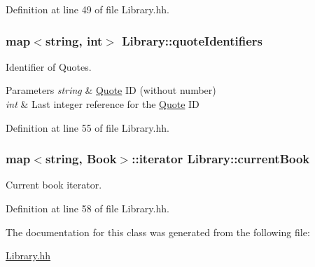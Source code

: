 Definition at line 49 of file Library.\+hh.

\subsubsection[{\texorpdfstring{quote\+Identifiers}{quoteIdentifiers}}]{\setlength{\rightskip}{0pt plus 5cm}map$<$string, int$>$ Library\+::quote\+Identifiers\hspace{0.3cm}{\ttfamily [private]}}\hypertarget{class_library_a58c1f12a0278872cd0299e586551bb7a}{}\label{class_library_a58c1f12a0278872cd0299e586551bb7a}


Identifier of Quotes. 


\begin{DoxyParams}{Parameters}
{\em string} & \hyperlink{class_quote}{Quote} ID (without number) \\
\hline
{\em int} & Last integer reference for the \hyperlink{class_quote}{Quote} ID \\
\hline
\end{DoxyParams}


Definition at line 55 of file Library.\+hh.

\subsubsection[{\texorpdfstring{current\+Book}{currentBook}}]{\setlength{\rightskip}{0pt plus 5cm}map$<$string, {\bf Book}$>$\+::iterator Library\+::current\+Book\hspace{0.3cm}{\ttfamily [private]}}\hypertarget{class_library_a78a4071e8d610da671b3886c71900dae}{}\label{class_library_a78a4071e8d610da671b3886c71900dae}


Current book iterator. 



Definition at line 58 of file Library.\+hh.



The documentation for this class was generated from the following file\+:\begin{DoxyCompactItemize}
\item 
\hyperlink{_library_8hh}{Library.\+hh}\end{DoxyCompactItemize}
